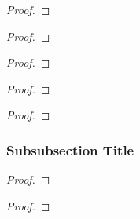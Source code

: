 \begin{coro}
    \lipsum[1]
\end{coro}

\begin{proof}
    \lipsum[1]
\end{proof}

\begin{lemm}
    \lipsum[1]
\end{lemm}

\begin{proof}
    \lipsum[1]
\end{proof}

\begin{thrm}
    \lipsum[1]
\end{thrm}

\begin{proof}
    \lipsum[1]
\end{proof}

\begin{coro}
    \lipsum[1]
\end{coro}

\begin{proof}
    \lipsum[1]
\end{proof}

\begin{coro}
    \lipsum[1]
\end{coro}

\begin{proof}
    \lipsum[1]
\end{proof}

\subsubsection{Subsubsection Title}

\begin{thrm}
    \lipsum[1]
\end{thrm}

\begin{proof}
    \lipsum[1]
\end{proof}

\begin{coro}
    \lipsum[1]
\end{coro}

\begin{proof}
    \lipsum[1]
\end{proof}

\begin{coro}
    \lipsum[1]
\end{coro}

